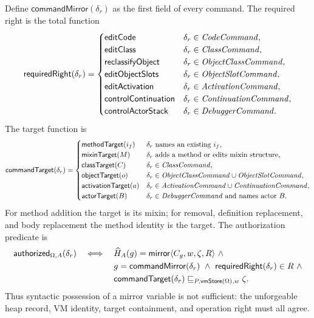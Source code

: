 Define $\mathsf{commandMirror}(\delta_r)$ as the first field of every command.
The required right is the total function
\begin{equation}\label{eq:reflection-command-right}
 \mathsf{requiredRight}(\delta_r)=
 \begin{cases}
  \mathsf{editCode}&\delta_r\in\mathit{CodeCommand},\\
  \mathsf{editClass}&\delta_r\in\mathit{ClassCommand},\\
  \mathsf{reclassifyObject}&\delta_r\in\mathit{ObjectClassCommand},\\
  \mathsf{editObjectSlots}&\delta_r\in\mathit{ObjectSlotCommand},\\
  \mathsf{editActivation}&\delta_r\in\mathit{ActivationCommand},\\
  \mathsf{controlContinuation}&\delta_r\in\mathit{ContinuationCommand},\\
  \mathsf{controlActorStack}&\delta_r\in\mathit{DebuggerCommand}.
 \end{cases}
\end{equation}
The target function is
\begin{equation}\label{eq:reflection-command-target}
 \mathsf{commandTarget}(\delta_r)=
 \begin{cases}
  \mathsf{methodTarget}(i_f)&\delta_r\text{ names an existing }i_f,\\
  \mathsf{mixinTarget}(M)&\delta_r\text{ adds a method or edits mixin structure},\\
  \mathsf{classTarget}(C)&\delta_r\in\mathit{ClassCommand},\\
  \mathsf{objectTarget}(o)&\delta_r\in
       \mathit{ObjectClassCommand}\cup\mathit{ObjectSlotCommand},\\
  \mathsf{activationTarget}(a)&\delta_r\in
       \mathit{ActivationCommand}\cup\mathit{ContinuationCommand},\\
  \mathsf{actorTarget}(B)&\delta_r\in\mathit{DebuggerCommand}
       \text{ and names actor }B.
 \end{cases}
\end{equation}
For method addition the target is its mixin; for removal, definition
replacement, and body replacement the method identity is the target.  The
authorization predicate is
\begin{equation}\label{eq:reflection-authorized}
\begin{split}
 \mathsf{authorized}_{\Omega,A}(\delta_r)\quad\Longleftrightarrow\quad{}
 &\widehat H_A(g)=\mathsf{mirror}\langle C_g,w,\zeta,R\rangle\ \land\\
 &g=\mathsf{commandMirror}(\delta_r)\ \land\
 \mathsf{requiredRight}(\delta_r)\in R\ \land\\
 &\mathsf{commandTarget}(\delta_r)
   \sqsubseteq_{P,\mathsf{vmStore}(\Omega),w}\zeta.
\end{split}
\end{equation}
Thus syntactic possession of a mirror variable is not sufficient: the
unforgeable heap record, VM identity, target containment, and operation right
must all agree.

